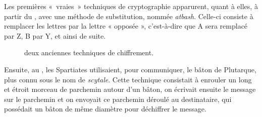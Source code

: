 Les premières «~vraies~» techniques de cryptographie apparurent,
quant à elles, à partir du , avec une méthode de substitution,
nommée \emph{atbash}. Celle-ci consiste à remplacer les lettres par la
lettre « opposée », c'est-à-dire que A sera remplacé par Z, B par Y,
et ainsi de suite.
\begin{figure}[h]
  \centering
    \hspace{1.5cm}
    \caption{deux anciennes techniques de chiffrement.}
    \vspace{-15pt}
\end{figure}


  
Ensuite, au , les Spartiates utilisaient, pour communiquer, le
bâton de Plutarque, plus connu sous le nom de \emph{scytale}. Cette
technique consistait à enrouler un long et étroit morceau de parchemin
autour d'un bâton, on écrivait ensuite le message sur le parchemin et
on envoyait ce parchemin déroulé au destinataire, qui possédait un
bâton de même diamètre pour déchiffrer le message.

